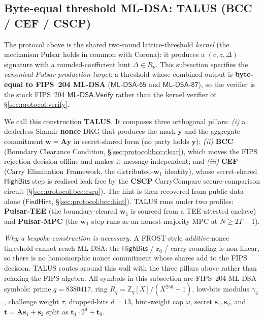 \subsection{Byte-equal threshold ML-DSA: TALUS (BCC / CEF / CSCP)}
\label{sec:protocol:bcc}

The protocol above is the shared two-round lattice-threshold
\emph{kernel} (the mechanism Pulsar holds in common with Corona): it
produces a $(c, z, \Delta)$ signature with a rounded-coefficient hint
$\Delta \in R_\nu$. This subsection specifies the \emph{canonical Pulsar
production target}: a threshold whose combined output is \textbf{byte-equal
to FIPS~204 ML-DSA} ($\mathsf{ML\text{-}DSA\text{-}65}$ and
$\mathsf{ML\text{-}DSA\text{-}87}$), so the verifier is the stock FIPS~204
$\mathsf{ML\text{-}DSA.Verify}$ rather than the kernel verifier of
\S\ref{sec:protocol:verify}.

We call this construction \textbf{TALUS}. It composes three orthogonal
pillars: \emph{(i)} a dealerless Shamir \textbf{nonce} DKG that produces
the mask $\mathbf{y}$ and the aggregate commitment $\mathbf{w} =
\mathbf{A}\mathbf{y}$ in secret-shared form (no party holds $\mathbf{y}$);
\emph{(ii)} \textbf{BCC} (Boundary Clearance Condition,
\S\ref{sec:protocol:bcc:clear}), which moves the FIPS rejection decision
offline and makes it message-independent; and \emph{(iii)} \textbf{CEF}
(Carry Elimination Framework, the distributed-$\mathbf{w}_1$ identity),
whose secret-shared $\mathsf{HighBits}$ step is realised leak-free by the
\textbf{CSCP} CarryCompare secure-comparison circuit
(\S\ref{sec:protocol:bcc:cscp}). The hint is then recovered from public
data alone ($\mathsf{FindHint}$, \S\ref{sec:protocol:bcc:hint}). TALUS runs
under two profiles: \textbf{Pulsar-TEE} (the boundary-cleared $\mathbf{w}_1$
is sourced from a TEE-attested enclave) and \textbf{Pulsar-MPC} (the
$\mathbf{w}_1$ step runs as an honest-majority MPC at $N \geq 2T-1$).

\emph{Why a bespoke construction is necessary.} A FROST-style
\emph{additive}-nonce threshold cannot reach ML-DSA: the $\mathsf{HighBits}$
/ $\mathbf{r}_0$ / carry rounding is non-linear, so there is no homomorphic
nonce commitment whose shares add to the FIPS decision. TALUS routes around
this wall with the three pillars above rather than relaxing the FIPS
algebra. All symbols in this subsection are FIPS~204 ML-DSA symbols: prime $q = 8380417$, ring
$R_q = \mathbb{Z}_q[X]/(X^{256}+1)$, low-bits modulus $\gamma_2$,
challenge weight $\tau$, dropped-bits $d = 13$, hint-weight cap $\omega$,
secret $\mathbf{s}_1, \mathbf{s}_2$, and $\mathbf{t} = \mathbf{A}\mathbf{s}_1
+ \mathbf{s}_2$ split as $\mathbf{t}_1 \cdot 2^d + \mathbf{t}_0$.

